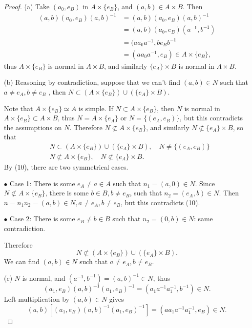 \documentclass[11pt,a4paper]{article}
\begin{document}
\begin{proof}
\item[(a)] Take $(a_0,e_B)$ in $A\times\{e_B\}$, and $(a,b) \in A\times B$. Then
\begin{align*}
(a,b)(a_0,e_B)(a,b)^{-1} &= (a,b)(a_0,e_B)(a,b)^{-1}\\
&=(a,b)(a_0,e_B)(a^{-1},b^{-1})\\
&=(aa_0a^{-1},be_Bb^{-1}\\
&=(aa_0a^{-1}, e_B) \in A \times\{e_B\},
\end{align*}
thus $A\times \{e_B\}$ is normal in $A \times B$, and similarly $\{e_A\} \times B$ is normal in $A \times B$.

\item[(b)] Reasoning by contradiction, suppose that we can't find $(a,b) \in N$ such that $a \ne e_A,b\ne e_B $ , then $N \subset (A \times \{e_B\}) \cup (\{e_A\} \times B)$. 

Note that $A\times \{e_B\} \simeq A$ is simple. If $N \subset A \times \{e_B\}$, then $N$ is normal in $A \times \{e_B\} \subset A \times B$, thus $N = A\times\{e_A\}$ or $N = \{(e_A,e_B)\}$, but this contradicts the assumptions on $N$. Therefore $N \not \subset A \times \{e_B\}$, and similarly $N \not \subset \{e_A\} \times B$, so that
\begin{align}
&N \subset (A \times \{e_B\}) \cup (\{e_A\} \times B), \quad N \ne \{(e_A,e_B)\}\\
&N \not \subset A \times \{e_B\}, \quad N \not \subset \{e_A\} \times B.
\end{align}
By (10), there are two symmetrical cases.

$\bullet$ Case 1: There is some $e_A \ne a \in A$ such that $n_1 = (a,0) \in N$. Since $N \not \subset A \times \{e_B\}$, there is some $b \in B, b\ne e_B$, such that $n_2 = (e_A,b) \in N$. Then $n = n_1n_2 = (a,b) \in N, a\ne e_A,b\ne e_B$, but this contradicts (10).

$\bullet$ Case 2: There is some $e_B \ne b \in B$ such that $n_2 = (0,b) \in N$: same contradiction.

Therefore
$$N \not \subset (A \times \{e_B\}) \cup (\{e_A\} \times B).$$
We can find $(a,b) \in N$ such that $a \ne e_A,b\ne e_B $.

\item[(c)] $N$ is normal, and  $(a^{-1},b^{-1}) = (a,b)^{-1} \in N$, thus
$$(a_1,e_B)(a,b)^{-1}(a_1,e_B)^{-1} = (a_1 a^{-1}a_1^{-1},b^{-1}) \in N.$$
Left multiplication by $(a,b) \in N$ gives
$$(a,b)[(a_1,e_B)(a,b)^{-1}(a_1,e_B)^{-1} ] = (aa_1a^{-1}a_1^{-1}, e_B) \in N.$$


\end{proof}
\end{document}
